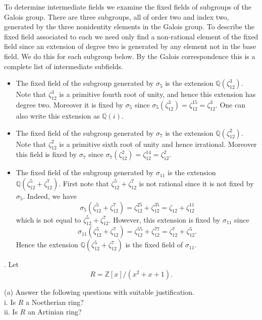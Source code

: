 \documentclass[11pt]{article}
\newcommand{\Z}{\mathbb{Z}}
\newcommand{\Q}{\mathbb{Q}}
\begin{document}
To determine intermediate fields we examine the fixed fields of subgroups of the Galois group. There are three subgroups, all of order two and index two, generated by the three nonidentity elements in the Galois group. To describe the fixed field associated to each we need only find a non-rational element of the fixed field since an extension of degree two is generated by any element not in the base field. We do this for each subgroup below. By the Galois correspondence this is a complete list of intermediate subfields. \begin{itemize}
\item The fixed field of the subgroup generated by $\sigma_5$ is the extension $\Q(\zeta_{12}^3)$. Note that $\zeta_{12}^3$ is a primitive fourth root of unity, and hence this extension has degree two. Moreover it is fixed by $\sigma_5$ since $\sigma_5(\zeta_{12}^3) = \zeta_{12}^{15} = \zeta_{12}^3$.  One can also write this extension as $\Q(i)$. 
\item The fixed field of the subgroup generated by $\sigma_7$ is the extension $\Q(\zeta_{12}^2)$. Note that $\zeta_{12}^2$ is a primitive sixth root of unity and hence irrational. Moreover this field is fixed by $\sigma_7$ since $\sigma_7(\zeta_{12}^2) = \zeta_{12}^{14} = \zeta_{12}^2$. 
\item The fixed field of the subgroup generated by $\sigma_{11}$ is the extension $\Q(\zeta_{12}^5 + \zeta_{12}^7)$. First note that $\zeta_{12}^5 + \zeta_{12}^7$ is not rational since it is not fixed by $\sigma_5$. Indeed, we have \[
\sigma_5(\zeta_{12}^5 + \zeta_{12}^7) = \zeta_{12}^{25} + \zeta_{12}^{35} = \zeta_{12} + \zeta_{12}^{11}
\] 
which is not equal to $\zeta_{12}^5 + \zeta_{12}^7$. However, this extension is fixed by $\sigma_{11}$ since \[
\sigma_{11}(\zeta_{12}^5 + \zeta_{12}^7) = \zeta_{12}^{55} + \zeta_{12}^{77} = \zeta_{12}^7 + \zeta_{12}^5.
\]
Hence the extension $\Q(\zeta_{12}^5 + \zeta_{12}^7)$ is the fixed field of $\sigma_{11}$. 
\end{itemize}
. Let \[
R = \Z[x]/(x^2+x+1).
\]

(a) Answer the following questions with suitable justification.\\
i. Is $R$ a Noetherian ring?\\
ii. Is $R$ an Artinian ring?
\end{document}
